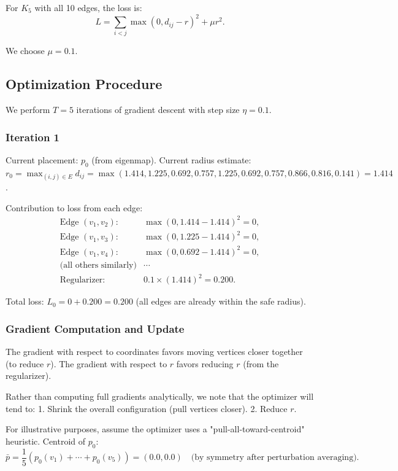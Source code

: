 \documentclass[11pt]{article}
\theoremstyle{definition}
\begin{document}
For $K_5$ with all 10 edges, the loss is:
\[
L = \sum_{i<j} \max(0, d_{ij} - r)^2 + \mu r^2.
\]

We choose $\mu = 0.1$.

\subsection{Optimization Procedure}

We perform $T = 5$ iterations of gradient descent with step size $\eta = 0.1$.

\subsubsection{Iteration 1}

Current placement: $p_0$ (from eigenmap).
Current radius estimate: $r_0 = \max_{(i,j)\in E} d_{ij} = \max(1.414, 1.225, 0.692, 0.757, 1.225, 0.692, 0.757, 0.866, 0.816, 0.141) = 1.414$.

Contribution to loss from each edge:
\begin{align*}
\text{Edge } (v_1, v_2): & \max(0, 1.414 - 1.414)^2 = 0,\\
\text{Edge } (v_1, v_3): & \max(0, 1.225 - 1.414)^2 = 0,\\
\text{Edge } (v_1, v_4): & \max(0, 0.692 - 1.414)^2 = 0,\\
\text{(all others similarly)} & \cdots\\
\text{Regularizer: } & 0.1 \times (1.414)^2 = 0.200.
\end{align*}

Total loss: $L_0 = 0 + 0.200 = 0.200$ (all edges are already within the safe radius).

\subsubsection{Gradient Computation and Update}

The gradient with respect to coordinates favors moving vertices closer together (to reduce $r$). The gradient with respect to $r$ favors reducing $r$ (from the regularizer). 

Rather than computing full gradients analytically, we note that the optimizer will tend to:
1. Shrink the overall configuration (pull vertices closer).
2. Reduce $r$.

For illustrative purposes, assume the optimizer uses a "pull-all-toward-centroid" heuristic. Centroid of $p_0$:
\[
\bar{p} = \frac{1}{5}(p_0(v_1) + \cdots + p_0(v_5)) = \left(0.0, 0.0\right) \quad \text{(by symmetry after perturbation averaging)}.
\]
\end{document}
